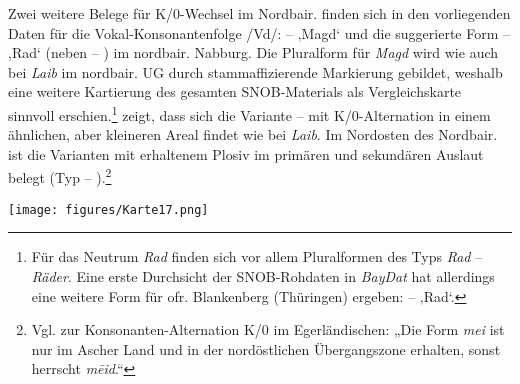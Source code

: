 Zwei weitere Belege für K/0-Wechsel im Nordbair. finden sich in den vorliegenden Daten für die Vokal-Konsonantenfolge /Vd/:  --  ‚Magd‘ und die suggerierte Form  --  ‚Rad‘ (neben  -- ) im nordbair. Nabburg. Die Pluralform für \textit{Magd} wird wie auch bei \textit{Laib} im nordbair. UG durch stammaffizierende Markierung gebildet, weshalb eine weitere Kartierung des gesamten SNOB-Materials als Vergleichskarte sinnvoll erschien.\footnote{Für das Neutrum \textit{Rad} finden sich vor allem Pluralformen des Typs \textit{Rad} -- \textit{Räder}. Eine erste Durchsicht der SNOB-Rohdaten in \textit{BayDat} hat allerdings eine weitere Form für ofr. Blankenberg (Thüringen) ergeben:  --  ‚Rad‘.}  zeigt, dass sich die Variante  --  mit K/0-Alternation in einem ähnlichen, aber kleineren Areal findet wie bei \textit{Laib}. Im Nordosten des Nordbair. ist die Varianten mit erhaltenem Plosiv im primären und sekundären Auslaut belegt (Typ  -- ).\footnote{Vgl. \citet[124]{Roth1940} zur Konsonanten-Alternation K/0 im Egerländischen: „Die Form \textit{mei} ist nur im Ascher Land und in der nordöstlichen Übergangszone erhalten, sonst herrscht \textit{mēid}.“}

\begin{map}
\texttt{[image: figures/Karte17.png]}
\caption{Pluralmarkierung bei \textit{Magd} im SNOB\protect\footnote{Das Heteronym \textit{Dirn} im Süden des UGs wurde nicht kartiert.}}
\label{map:17}
\end{map}

